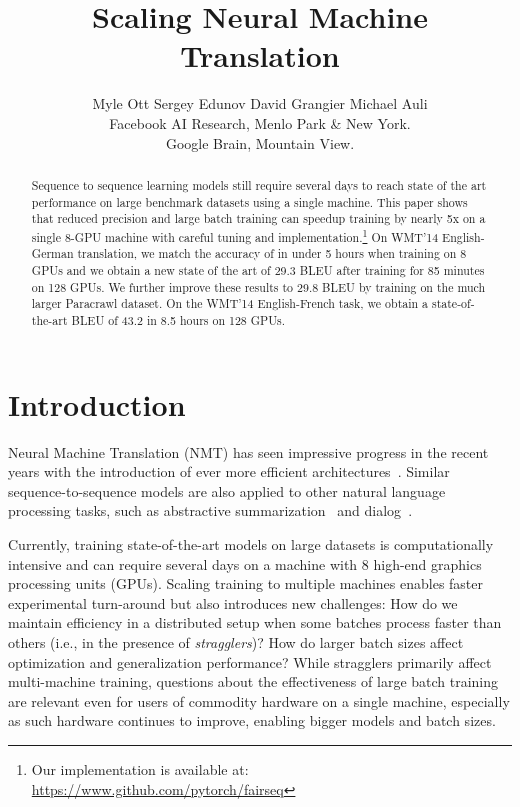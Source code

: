 \documentclass[11pt,a4paper]{article}
\title{Scaling Neural Machine Translation}
\author{Myle Ott
\quad Sergey Edunov
\quad David Grangier\hspace{1pt}
\quad Michael Auli
\\
Facebook AI Research, Menlo Park \& New York. \quad \\
Google Brain, Mountain View.
}
\date{}
\begin{document}
\maketitle

{\let\thefootnote\relax{}}

\begin{abstract}
Sequence to sequence learning models still require several days to reach state of the art performance on large benchmark datasets using a single machine. This paper 
shows that reduced precision and large batch training can speedup training by nearly 5x on a single 8-GPU machine with careful tuning and implementation.\footnote{Our implementation is available at:\\ 
\url{https://www.github.com/pytorch/fairseq}}
On WMT'14 English-German translation, we match the accuracy of \citet{vaswani2017transformer} in under 5 hours when training on 8 GPUs and we obtain a new state of the art of 29.3 BLEU after training for 85 minutes on 128 GPUs.
We further improve these results to 29.8 BLEU by training on the much larger Paracrawl dataset.
On the WMT'14 English-French task, we obtain a state-of-the-art BLEU of 43.2 in 8.5 hours on 128 GPUs.


\end{abstract}


\section{Introduction}

Neural Machine Translation (NMT) has seen impressive progress in the recent years with the introduction of ever more efficient architectures~\citep{bahdanau2015neural,gehring2017convs2s,vaswani2017transformer}. Similar sequence-to-sequence models are also applied to other natural language processing tasks, such as abstractive summarization~\citep{see2017acl,paulus2018iclr} and dialog~\citep{sordoni2015acl,serban2017AHL,dusek2016seq2seq}.

Currently, training state-of-the-art models on large datasets is computationally intensive and can require several days on a machine with 8 high-end graphics processing units (GPUs). Scaling training to multiple machines enables faster experimental turn-around but also introduces new challenges:
How do we maintain efficiency in a distributed setup when some batches process faster than others (i.e., in the presence of \emph{stragglers})?
How do larger batch sizes affect optimization and generalization performance?
While stragglers primarily affect multi-machine training, questions about the effectiveness of large batch training are relevant even for users of commodity hardware on a single machine, especially as such hardware continues to improve, enabling bigger models and batch sizes.
\end{document}
